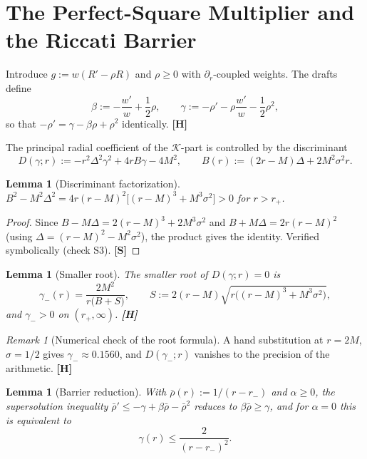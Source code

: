 \documentclass[11pt,a4paper]{article}
\newcommand{\VS}{\textcolor{vs}{\textbf{[S]}}}
\newcommand{\VH}{\textcolor{vh}{\textbf{[H]}}}
\newtheorem{lemma}[theorem]{Lemma}
\theoremstyle{remark}
\newtheorem{remark}[theorem]{Remark}
\theoremstyle{definition}
\begin{document}
\section{The Perfect-Square Multiplier and the Riccati Barrier}
\label{sec:riccati}

Introduce $g := w(R' - \rho R)$ and $\rho \ge 0$ with $\partial_r$-coupled weights. The drafts define
\[
\beta := -\frac{w'}{w} + \frac12\rho, \qquad \gamma := -\rho' - \rho\frac{w'}{w} - \frac12\rho^2,
\]
so that $-\rho' = \gamma - \beta\rho + \rho^2$ identically. \VH

The principal radial coefficient of the $\mathcal{K}$-part is controlled by the discriminant
\[
D(\gamma;r) := -r^2\Delta^2\gamma^2 + 4rB\gamma - 4M^2, \qquad B(r) := (2r-M)\Delta + 2M^2\sigma^2 r.
\]

\begin{lemma}[Discriminant factorization]
\label{lem:disc}
$B^2 - M^2\Delta^2 = 4r(r-M)^2\bigl[(r-M)^3 + M^3\sigma^2\bigr] > 0$ for $r > r_+$.
\end{lemma}

\begin{proof}
Since $B - M\Delta = 2(r-M)^3 + 2M^3\sigma^2$ and $B + M\Delta = 2r(r-M)^2$ (using $\Delta = (r-M)^2 - M^2\sigma^2$), the product gives the identity. Verified symbolically (check S3). \VS
\end{proof}

\begin{lemma}[Smaller root]
\label{lem:root}
The smaller root of $D(\gamma;r)=0$ is
\[
\gamma_-(r) = \frac{2M^2}{r\bigl(B + S\bigr)}, \qquad S := 2(r-M)\sqrt{r\bigl((r-M)^3 + M^3\sigma^2\bigr)},
\]
and $\gamma_- > 0$ on $(r_+,\infty)$. \VH
\end{lemma}

\begin{remark}[Numerical check of the root formula]
A hand substitution at $r=2M$, $\sigma=1/2$ gives $\gamma_- \approx 0.1560$, and $D(\gamma_-;r)$ vanishes to the precision of the arithmetic. \VH
\end{remark}

\begin{lemma}[Barrier reduction]
\label{lem:barrier}
With $\bar\rho(r) := 1/(r-r_-)$ and $\alpha \ge 0$, the supersolution inequality $\bar\rho' \le -\gamma + \beta\bar\rho - \bar\rho^2$ reduces to $\beta\bar\rho \ge \gamma$, and for $\alpha = 0$ this is equivalent to
\[
\gamma(r) \le \frac{2}{(r-r_-)^2}.
\]
\end{lemma}
\end{document}

